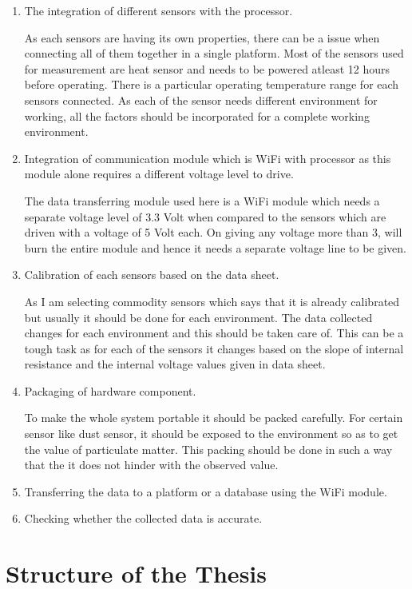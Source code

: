 \begin{enumerate}


\item The integration of different sensors with the processor.
\par
As each sensors are having its own properties, there can be a issue when connecting all of them together in a single platform. Most of the sensors used for measurement are heat sensor and needs to be powered atleast 12 hours before operating. There is a particular operating temperature range for each sensors connected. As each of the sensor needs different environment for working, all the factors should be incorporated for a complete working environment.

\item Integration of communication module which is  WiFi with processor as this module alone requires a different voltage level to drive.
\par
The data transferring module used here is a WiFi module which needs a separate voltage level of 3.3 Volt when compared to the sensors which are driven with a voltage of 5 Volt each. On giving any voltage more than 3, will burn the entire module and hence it needs a separate voltage line to be given. 

\item Calibration of each sensors based on the data sheet.
\par
As I am selecting commodity sensors which says that it is already calibrated but usually it should be done for each environment. The data collected changes for each environment and this should be taken care of. This can be a tough task as for each of the sensors it changes based on the slope of internal resistance and the internal voltage values given in data sheet. 
\item Packaging of hardware component.
\par
To make the whole system portable it should be packed carefully. For certain sensor like dust sensor, it should be exposed to the environment so as to get the value of particulate matter. This packing should be done in such a way that the it does not hinder with the observed value.

\item Transferring the data to a platform or a database using the WiFi module.

\item Checking whether the collected data is accurate.


\end{enumerate}

\section{Structure of the Thesis}